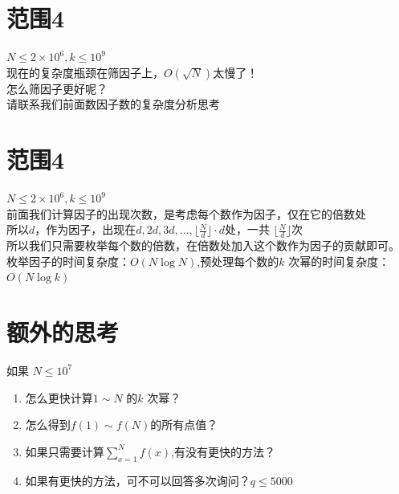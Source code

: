 \documentclass[11pt]{beamer}
\begin{document}
\section{范围4}
\begin{frame}
$N \leq 2\times 10^6, k \leq 10^9$\\
现在的复杂度瓶颈在筛因子上，$O(\sqrt N)$太慢了！\\
怎么筛因子更好呢？\\
请联系我们前面数因子数的复杂度分析思考\\
\end{frame}

\section{范围4}
\begin{frame}
$N \leq 2\times 10^6, k \leq 10^9$\\
前面我们计算因子的出现次数，是考虑每个数作为因子，仅在它的倍数处\\
所以$d$，作为因子，出现在$d, 2d, 3d, ..., \lfloor\frac{N}{d}\rfloor \cdot d$处，一共 $\lfloor\frac{N}{d}\rfloor$次\\
所以我们只需要枚举每个数的倍数，在倍数处加入这个数作为因子的贡献即可。\\
枚举因子的时间复杂度：$O(N \log N)$,预处理每个数的$k$ 次幂的时间复杂度：$O(N \log k)$
\end{frame}

\section{额外的思考}
\begin{frame}
如果 $N \leq 10^7$
\begin{enumerate}
    \item 怎么更快计算$1 \sim N$ 的$k$ 次幂？
    \item 怎么得到$f(1) \sim f(N)$的所有点值？
    \item 如果只需要计算$\sum_{x = 1}^N f(x)$,有没有更快的方法？
    \item 如果有更快的方法，可不可以回答多次询问？$q \leq 5000$
\end{enumerate}
\end{frame}
\end{document}
